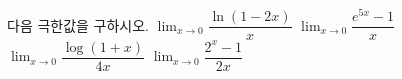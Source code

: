 다음 극한값을 구하시오.
 $\displaystyle\lim_{x\to 0}\dfrac{\ln(1-2x)}{x}$
 $\displaystyle\lim_{x\to 0}\dfrac{e^{5x}-1}{x}$
 $\displaystyle\lim_{x\to 0}\dfrac{\log(1+x)}{4x}$
 $\displaystyle\lim_{x\to 0}\dfrac{2^x-1}{2x}$
